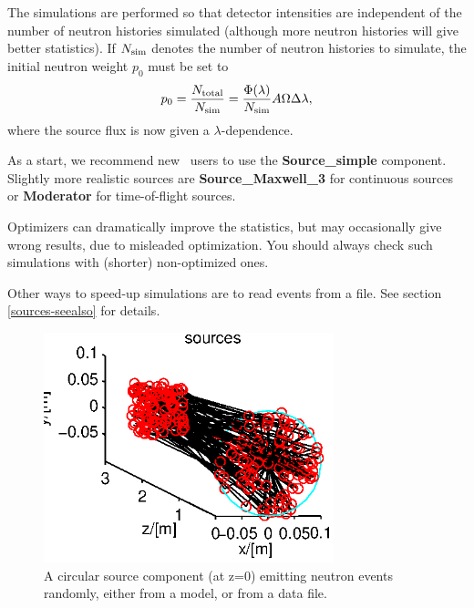 The simulations are performed so that detector intensities
are independent of the number of neutron histories simulated
(although more neutron histories will give better statistics).
If $N_{\rm sim}$ denotes the number of
neutron histories to simulate, the initial neutron weight $p_0$ must be set to
\begin{equation}
\label{proprule}
p_0 = \frac{N_{\rm total}}{N_{\rm sim}} =
    \frac{\Phi(\lambda)}{N_{\rm sim}} A \Omega \Delta\lambda ,
\end{equation}
where the source flux is now given a $\lambda$-dependence.

As a start, we recommend new \MCS\ users to use the
{\bf Source\_simple} component.
Slightly more realistic sources are {\bf Source\_Maxwell\_3} for
continuous sources or {\bf Moderator} for time-of-flight sources.

Optimizers can dramatically improve the statistics, but may occasionally
give wrong results, due to misleaded optimization.
You should always check such simulations with (shorter) non-optimized ones.

Other ways to speed-up simulations are to read events from a file.
See section \ref{sources-seealso} for details.

\begin{figure}
  \begin{center}
    \includegraphics[width=0.75\textwidth]{figures/sources.eps}
  \end{center}
\caption{A circular source component (at z=0) emitting neutron events randomly, either from a model, or from a data file.}
\label{f:source}
\end{figure}

\newpage





